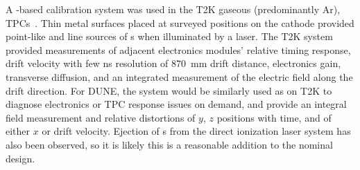 A \phel{}-based calibration system was used in the T2K gaseous (predominantly Ar), TPCs~\cite{Abgrall:2010hi}. %
Thin metal surfaces placed at surveyed positions on the cathode provided point-like and line sources of \phel{}s when illuminated by a laser. The T2K \phel system provided measurements of adjacent electronics modules' relative timing response, drift velocity with few \si{\nano\s} resolution of \SI{870}{\milli\m} drift distance, electronics gain, transverse diffusion, and an integrated measurement of the electric field along the drift direction. For DUNE, the system would be similarly used as on T2K to diagnose electronics or TPC response issues on demand, and provide an integral field measurement and relative distortions of $y$, $z$ positions with time, and of either $x$ or drift velocity. Ejection of \phel{}s from the direct ionization laser system has also been observed, so it is likely this is a reasonable addition to the nominal design.%

